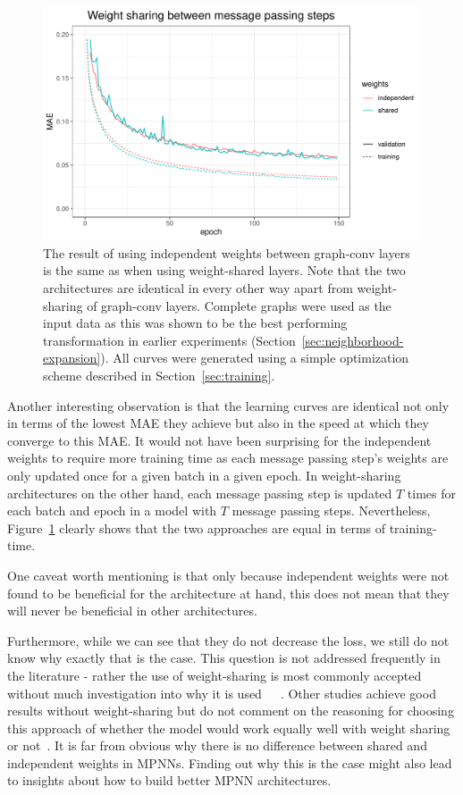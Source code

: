 \begin{figure}[H]
	\includegraphics[width=\linewidth]{figures/weight-sharing.pdf}
	\caption{The result of using independent weights between graph-conv layers is the same as when using weight-shared layers. Note that the two architectures are identical in every other way apart from weight-sharing of graph-conv layers. Complete graphs were used as the input data as this was shown to be the best performing transformation in earlier experiments (Section~\ref{sec:neighborhood-expansion}). All curves were generated using a simple optimization scheme described in Section~\ref{sec:training}.}
	\label{fig:weight-sharing}
\end{figure}


Another interesting observation is that the learning curves are identical not only in terms of the lowest MAE they achieve but also in the speed at which they converge to this MAE. It would not have been surprising for the independent weights to require more training time as each message passing step's weights are only updated once for a given batch in a given epoch. In weight-sharing architectures on the other hand, each message passing step is updated $T$ times for each batch and epoch in a model with $T$ message passing steps. Nevertheless, Figure~\ref{fig:weight-sharing} clearly shows that the two approaches are equal in terms of training-time.

One caveat worth mentioning is that only because independent weights were not found to be beneficial for the architecture at hand, this does not mean that they will never be beneficial in other architectures.

Furthermore, while we can see that they do not decrease the loss, we still do not know why exactly that is the case. This question is not addressed frequently in the literature - rather the use of weight-sharing is most commonly accepted without much investigation into why it is used~\cite{Chen2019}~\cite{Schutt2017}~\cite{Klicpera2019}. Other studies achieve good results without weight-sharing but do not comment on the reasoning for choosing this approach of whether the model would work equally well with weight sharing or not~\cite{Jørgensen2018}. It is far from obvious why there is no difference between shared and independent weights in MPNNs. Finding out why this is the case might also lead to insights about how to build better MPNN architectures.  

